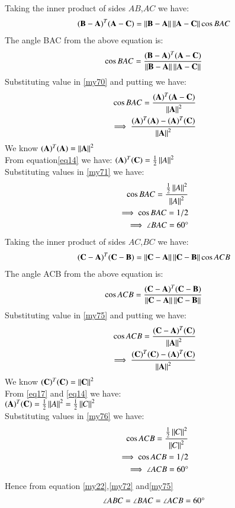 \documentclass[journal,12pt,twocolumn]{IEEEtran}
\begin{document}
Taking the inner product of sides $AB$,$AC$ we have:
\begin{align}
    (\mathbf{B}-\mathbf{A})^T(\mathbf{A}-\mathbf{C}) =
    \left\lVert\mathbf{B}-\mathbf{A}\right\rVert\left\lVert\mathbf{A}-\mathbf{C}\right\rVert\cos{BAC}
\end{align}
The angle BAC from the  above equation is:
\begin{align}\label{my70}
     \cos{BAC} = \frac{(\mathbf{B}-\mathbf{A})^T(\mathbf{A}-\mathbf{C})}{\left\lVert\mathbf{B}-\mathbf{A}\right\rVert\left\lVert\mathbf{A}-\mathbf{C}\right\rVert} 
\end{align}
Substituting value in \ref{my70} and putting we have:
\begin{align}\label{my71}
     \cos{BAC} = \frac{(\mathbf{A})^T(\mathbf{A-C})}{\left\lVert\mathbf{A}\right\rVert^2}\\
     \implies \frac{(\mathbf{A})^T(\mathbf{A})-(\mathbf{A})^T(\mathbf{C})}{\left\lVert\mathbf{A}\right\rVert^2}
\end{align}
We know $(\mathbf{A})^T (\mathbf{A})= {\left\lVert\mathbf{A}\right\rVert^2}$\\
From  equation\ref{eq14} we have:
$ (\mathbf{A})^T(\mathbf{C})= \frac{1}{2}\left\lVert A\right\rVert^2$\\
Substituting values in \ref{my71} we have:
\begin{align}\label{my72}
\cos{BAC} =
    \frac{{\frac{1}{2}\left\lVert A\right\rVert^2}}{\left\lVert A\right\rVert^2}\nonumber\\
     \implies \cos{BAC} = 1/2\nonumber\\
\implies \angle {BAC =60 \degree}
\end{align}
Taking the inner product of sides $AC$,$BC$ we have:
\begin{align}
    (\mathbf{C}-\mathbf{A})^T(\mathbf{C}-\mathbf{B}) =
    \left\lVert\mathbf{C}-\mathbf{A}\right\rVert\left\lVert\mathbf{C}-\mathbf{B}\right\rVert\cos{ACB}
\end{align}
The angle ACB from the  above equation is:
\begin{align}\label{my75}
     \cos{ACB} = \frac{(\mathbf{C}-\mathbf{A})^T(\mathbf{C}-\mathbf{B})}{\left\lVert\mathbf{C}-\mathbf{A}\right\rVert\left\lVert\mathbf{C}-\mathbf{B}\right\rVert} 
\end{align}
Substituting value in \ref{my75} and putting we have:
\begin{align}\label{my76}
     \cos{ACB} = \frac{(\mathbf{C-A})^T(\mathbf{C})}{\left\lVert\mathbf{A}\right\rVert^2}\nonumber\\
     \implies \frac{(\mathbf{C})^T(\mathbf{C})-(\mathbf{A})^T(\mathbf{C})}{\left\lVert\mathbf{A}\right\rVert^2}
\end{align}
We know $(\mathbf{C})^T (\mathbf{C})= {\left\lVert\mathbf{C}\right\rVert^2}$\\
From   \ref{eq17}  and \ref{eq14}  we have:\\
$(\mathbf{A})^T(\mathbf{C})= \frac{1}{2}\left\lVert A\right\rVert^2=\frac{1}{2}\left\lVert C\right\rVert^2$\\
Substituting values in \ref{my76} we have:
\begin{align}\label{my75}
\cos {ACB}=
     \frac{{\frac{1}{2}\left\lVert C\right\rVert^2}}{\left\lVert C\right\rVert^2}\nonumber\\
     \implies \cos{ACB} = 1/2\nonumber\\
\implies \angle {ACB = 60} \degree
\end{align}
Hence from  equation \ref{my22},\ref{my72} and\ref{my75}
\begin{align}
\angle {ABC} =\angle {BAC}=\angle {ACB}=60\degree
    \end{align}
\end{document}
